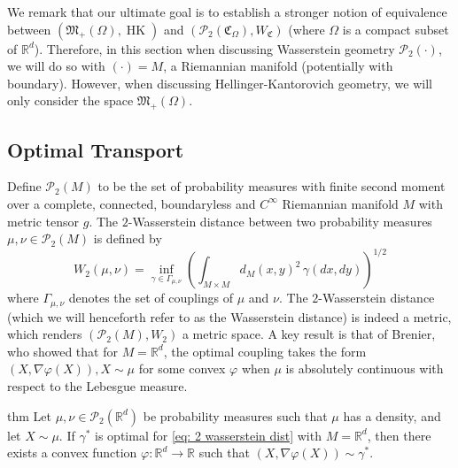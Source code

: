 \documentclass[11pt]{article}
\newcommand{\man}{M}
\newcommand{\HK}{\operatorname{HK}}
\begin{document}
We remark that our ultimate goal is to establish a stronger notion of equivalence between $(\mathfrak{M}_+(\Omega), \HK)$ and $(\mathcal{P}_2(\mathfrak{C}_\Omega), W_\mathfrak{C})$ (where $\Omega$ is a compact subset of $\mathbb{R}^d$). Therefore, in this section when discussing Wasserstein geometry $\mathcal{P}_2(\cdot)$, we will do so with $(\cdot) = \man$, a Riemannian manifold (potentially with boundary). However, when discussing Hellinger-Kantorovich geometry, we will only consider the space $\mathfrak{M}_+(\Omega).$ 

\subsection{Optimal Transport} Define $\mathcal{P}_{2}(\man)$ to be the set of probability measures with finite second moment over a complete, connected, boundaryless and $C^{\infty}$ Riemannian manifold $\man$ with metric tensor $g$. The $2$-Wasserstein distance between two probability measures $\mu, \nu \in \mathcal{P}_{2}(\man)$ is defined by
\begin{equation}
    W_2(\mu, \nu) = \inf_{\gamma \in \Gamma_{\mu, \nu}}\left(\int_{\man \times \man} d_M(x,y)^2\,\gamma(dx, dy)\right)^{1/2} \label{eq: 2 wasserstein dist}
\end{equation}
where $\Gamma_{\mu, \nu}$ denotes the set of couplings of $\mu$ and $\nu$. The $2$-Wasserstein distance (which we will henceforth refer to as the Wasserstein distance) is indeed a metric, which renders $(\mathcal{P}_{2}(\man), W_2)$ a metric space. A key result is that of Brenier, who showed that for $\man = \mathbb{R}^d$, the optimal coupling takes the form $(X, \nabla \varphi(X)), X \sim \mu$ for some convex $\varphi$ when $\mu$ is absolutely continuous with respect to the Lebesgue measure.

\begin{restatable}[Brenier]{thm}{} \label{brenier}
    Let $\mu, \nu \in \mathcal{P}_2(\mathbb{R}^d)$ be probability measures such that $\mu$ has a density, and let $X \sim \mu$. If $\gamma^*$ is optimal for \cref{eq: 2 wasserstein dist} with $\man = \mathbb{R}^d$, then there exists a convex function $\varphi:\mathbb{R}^d \rightarrow \mathbb{R}$ such that $(X, \nabla\varphi(X))\sim \gamma^*$. 
\end{restatable}
\end{document}
